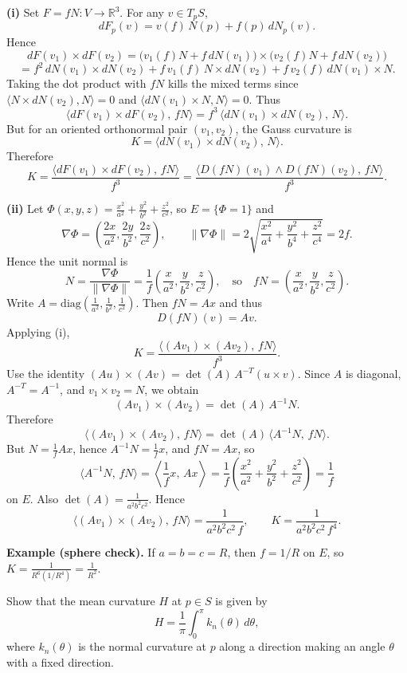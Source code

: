 \begin{solution}
\textbf{(i)} Set $F=fN:V\to\mathbb R^3$. For any $v\in T_pS$,
	\[
	dF_p(v)=v(f)\,N(p)+f(p)\,dN_p(v).
	\]
	Hence
	\[
	dF(v_1)\times dF(v_2)
	=
	\big(v_1(f)N+f\,dN(v_1)\big)\times\big(v_2(f)N+f\,dN(v_2)\big)
	\]
	\[
	= f^2\,dN(v_1)\times dN(v_2)
	+ f\,v_1(f)\,N\times dN(v_2)
	+ f\,v_2(f)\,dN(v_1)\times N.
	\]
	Taking the dot product with $fN$ kills the mixed terms since
	$\langle N\times dN(v_2),N\rangle=0$ and $\langle dN(v_1)\times N,N\rangle=0$.
	Thus
	\[
	\big\langle dF(v_1)\times dF(v_2),\,fN\big\rangle
	=
	f^3\,\big\langle dN(v_1)\times dN(v_2),\,N\big\rangle.
	\]
	But for an oriented orthonormal pair $(v_1,v_2)$, the Gauss curvature is
	\[
	K=\big\langle dN(v_1)\times dN(v_2),\,N\big\rangle.
	\]
	Therefore
	\[
	K=\frac{\big\langle dF(v_1)\times dF(v_2),\,fN\big\rangle}{f^3}
	=
	\frac{\big\langle D(fN)(v_1)\wedge D(fN)(v_2),\,fN\big\rangle}{f^3}.
	\]
	
	\medskip
	\textbf{(ii)} Let $\Phi(x,y,z)=\frac{x^2}{a^2}+\frac{y^2}{b^2}+\frac{z^2}{c^2}$, so $E=\{\Phi=1\}$ and
	\[
	\nabla\Phi=\left(\frac{2x}{a^2},\frac{2y}{b^2},\frac{2z}{c^2}\right),\qquad
	\|\nabla\Phi\|=2\sqrt{\frac{x^2}{a^4}+\frac{y^2}{b^4}+\frac{z^2}{c^4}}=2f.
	\]
	Hence the unit normal is
	\[
	N=\frac{\nabla\Phi}{\|\nabla\Phi\|}=\frac1f\left(\frac{x}{a^2},\frac{y}{b^2},\frac{z}{c^2}\right),
	\quad\text{so}\quad
	fN=\left(\frac{x}{a^2},\frac{y}{b^2},\frac{z}{c^2}\right).
	\]
	Write $A=\mathrm{diag}\!\left(\frac1{a^2},\frac1{b^2},\frac1{c^2}\right)$. Then $fN=Ax$ and thus
	\[
	D(fN)(v)=Av.
	\]
	Applying (i),
	\[
	K=\frac{\langle (Av_1)\times(Av_2),\,fN\rangle}{f^3}.
	\]
	Use the identity $(Au)\times(Av)=\det(A)\,A^{-T}(u\times v)$. Since $A$ is diagonal, $A^{-T}=A^{-1}$, and
	$v_1\times v_2=N$, we obtain
	\[
	(Av_1)\times(Av_2)=\det(A)\,A^{-1}N.
	\]
	Therefore
	\[
	\langle (Av_1)\times(Av_2),\,fN\rangle
	=\det(A)\,\langle A^{-1}N,\,fN\rangle.
	\]
	But $N=\frac1f Ax$, hence $A^{-1}N=\frac1f x$, and $fN=Ax$, so
	\[
	\langle A^{-1}N,\,fN\rangle
	=\left\langle \frac1f x,\,Ax\right\rangle
	=\frac1f\left(\frac{x^2}{a^2}+\frac{y^2}{b^2}+\frac{z^2}{c^2}\right)
	=\frac1f
	\]
	on $E$. Also $\det(A)=\frac1{a^2b^2c^2}$. Hence
	\[
	\langle (Av_1)\times(Av_2),\,fN\rangle=\frac{1}{a^2b^2c^2\,f},
	\qquad
	K=\frac{1}{a^2b^2c^2\,f^4}.
	\]
	
	\medskip
	\textbf{Example (sphere check).}
	If $a=b=c=R$, then $f=1/R$ on $E$, so $K=\frac{1}{R^6(1/R^4)}=\frac1{R^2}$.
\end{solution}

\begin{problem}
\label{prob:cp-vii-0049}
Show that the mean curvature $H$ at $p\in S$ is given by
\[
H=\frac1\pi\int_0^\pi k_n(\theta)\,d\theta,
\]
where $k_n(\theta)$ is the normal curvature at $p$ along a direction making an angle $\theta$ with a fixed direction.

\medskip
\end{problem}

